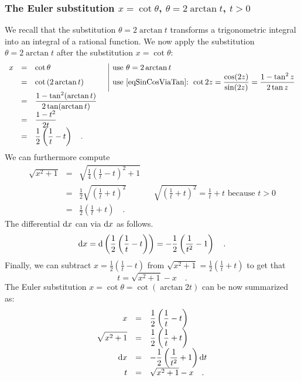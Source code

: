 \documentclass[12pt]{book}
\begin{document}
\subsubsection{The Euler substitution $x=\cot \theta$, $\theta=2\arctan t$, $t>0$}
We recall that the substitution $\theta=2\arctan t$ transforms a trigonometric integral into an integral of a rational function. We now apply the substitution $\theta=2\arctan t$ after the substitution $x=\cot\theta$:
\[
\begin{array}{rcll|l}
x&=&\displaystyle \cot \theta &&\text{use } \theta=2\arctan t\\
&=& \displaystyle \cot \left(2\arctan t\right) &&\displaystyle  \text{use \eqref{eqSinCosViaTan}: } \cot 2z=\frac{\cos (2z)}{\sin (2z)}=\frac{1-\tan^2z}{2\tan z } \\
&=&\displaystyle \frac{1-\tan^2 (\arctan t)}{2 \tan (\arctan t)} \\
&=&\displaystyle \frac{1-t^2}{2t}\\
&=&\displaystyle \frac{1}{2}\left(\frac{1}t -t\right)\quad .
\end{array}
\]
We can furthermore compute
\begin{equation} \label{eqsqrtx2plus1Euler2}
\begin{array}{rcll|l}
\displaystyle \sqrt{x^2+1}&=& \displaystyle  \sqrt{ \frac{1}{4} \left(\frac{1}t -t \right)^2 +1}\\
&=&\displaystyle \frac{1}{2} \sqrt{\left( \frac{1}{t} +t \right)^2} & &\displaystyle \sqrt{\left(\frac{1}{t}+t\right)^2} = \frac{1}{t} +t \text{ because }t>0\\
&=&\displaystyle \frac{1}{2}\left(\frac{1}{t}+t\right)\quad .
\end{array}
\end{equation}
The differential ${\normalfont \text{d}} x$ can via ${\normalfont \text{d}} x $ as follows.
\[
{\normalfont \text{d}} x={\normalfont \text{d}} \left(\frac{1}{2} \left( \frac{1}{t} - t\right)\right) = -\frac{1}{2} \left(\frac{1}{t^2}-1\right)\quad .
\]
Finally, we can subtract $\displaystyle x=\frac{1}{2} \left( \frac{1}{t} - t\right)$ from  $\displaystyle \sqrt{x^2+1}= \frac{1}{2} \left( \frac{1 }{ t} +t\right)$ to get that \[t=\sqrt{x^2+1}-x \quad .\]
The Euler substitution $x=\cot \theta= \cot (\arctan 2t)$ can be now summarized as:
\begin{equation}\label{eqEulerSub1.2}
\begin{array}{rcl}
x&=&\displaystyle \frac12\left(\frac{1}{t}- t\right)\\
\displaystyle\sqrt{x^2+1}&=& \displaystyle \frac12 \left(\frac1t +t\right)\\
\displaystyle {\normalfont \text{d}} x&=&\displaystyle -\frac12\left(\frac{1}{t^2}+1\right) {\normalfont \text{d}} t\\
t &=&\sqrt{x^2+1}-x\quad .
\end{array}
\end{equation}
\end{document}
